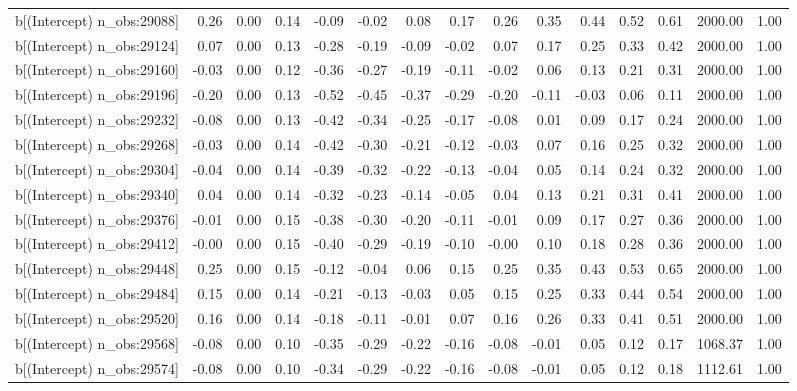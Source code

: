 \begin{table}[ht]
\begin{tabular}{rrrrrrrrrrrrrrr}
  b[(Intercept) n\_obs:29088] & 0.26 & 0.00 & 0.14 & -0.09 & -0.02 & 0.08 & 0.17 & 0.26 & 0.35 & 0.44 & 0.52 & 0.61 & 2000.00 & 1.00 \\ 
  b[(Intercept) n\_obs:29124] & 0.07 & 0.00 & 0.13 & -0.28 & -0.19 & -0.09 & -0.02 & 0.07 & 0.17 & 0.25 & 0.33 & 0.42 & 2000.00 & 1.00 \\ 
  b[(Intercept) n\_obs:29160] & -0.03 & 0.00 & 0.12 & -0.36 & -0.27 & -0.19 & -0.11 & -0.02 & 0.06 & 0.13 & 0.21 & 0.31 & 2000.00 & 1.00 \\ 
  b[(Intercept) n\_obs:29196] & -0.20 & 0.00 & 0.13 & -0.52 & -0.45 & -0.37 & -0.29 & -0.20 & -0.11 & -0.03 & 0.06 & 0.11 & 2000.00 & 1.00 \\ 
  b[(Intercept) n\_obs:29232] & -0.08 & 0.00 & 0.13 & -0.42 & -0.34 & -0.25 & -0.17 & -0.08 & 0.01 & 0.09 & 0.17 & 0.24 & 2000.00 & 1.00 \\ 
  b[(Intercept) n\_obs:29268] & -0.03 & 0.00 & 0.14 & -0.42 & -0.30 & -0.21 & -0.12 & -0.03 & 0.07 & 0.16 & 0.25 & 0.32 & 2000.00 & 1.00 \\ 
  b[(Intercept) n\_obs:29304] & -0.04 & 0.00 & 0.14 & -0.39 & -0.32 & -0.22 & -0.13 & -0.04 & 0.05 & 0.14 & 0.24 & 0.32 & 2000.00 & 1.00 \\ 
  b[(Intercept) n\_obs:29340] & 0.04 & 0.00 & 0.14 & -0.32 & -0.23 & -0.14 & -0.05 & 0.04 & 0.13 & 0.21 & 0.31 & 0.41 & 2000.00 & 1.00 \\ 
  b[(Intercept) n\_obs:29376] & -0.01 & 0.00 & 0.15 & -0.38 & -0.30 & -0.20 & -0.11 & -0.01 & 0.09 & 0.17 & 0.27 & 0.36 & 2000.00 & 1.00 \\ 
  b[(Intercept) n\_obs:29412] & -0.00 & 0.00 & 0.15 & -0.40 & -0.29 & -0.19 & -0.10 & -0.00 & 0.10 & 0.18 & 0.28 & 0.36 & 2000.00 & 1.00 \\ 
  b[(Intercept) n\_obs:29448] & 0.25 & 0.00 & 0.15 & -0.12 & -0.04 & 0.06 & 0.15 & 0.25 & 0.35 & 0.43 & 0.53 & 0.65 & 2000.00 & 1.00 \\ 
  b[(Intercept) n\_obs:29484] & 0.15 & 0.00 & 0.14 & -0.21 & -0.13 & -0.03 & 0.05 & 0.15 & 0.25 & 0.33 & 0.44 & 0.54 & 2000.00 & 1.00 \\ 
  b[(Intercept) n\_obs:29520] & 0.16 & 0.00 & 0.14 & -0.18 & -0.11 & -0.01 & 0.07 & 0.16 & 0.26 & 0.33 & 0.41 & 0.51 & 2000.00 & 1.00 \\ 
  b[(Intercept) n\_obs:29568] & -0.08 & 0.00 & 0.10 & -0.35 & -0.29 & -0.22 & -0.16 & -0.08 & -0.01 & 0.05 & 0.12 & 0.17 & 1068.37 & 1.00 \\ 
  b[(Intercept) n\_obs:29574] & -0.08 & 0.00 & 0.10 & -0.34 & -0.29 & -0.22 & -0.16 & -0.08 & -0.01 & 0.05 & 0.12 & 0.18 & 1112.61 & 1.00 \\ 

\end{tabular}
\end{table}
